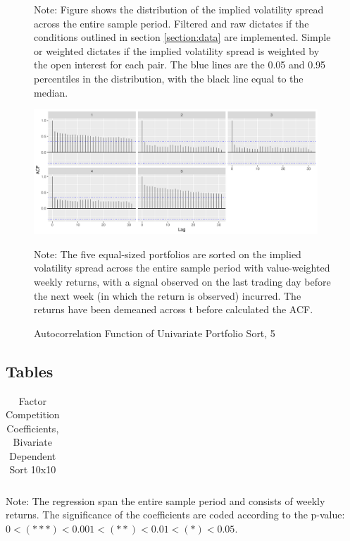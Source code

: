 \begin{figure}
	{\small Note: Figure shows the distribution of the implied volatility spread across the entire sample period. Filtered and raw dictates if the conditions outlined in section \ref{section:data} are implemented. Simple or weighted dictates if the implied volatility spread is weighted by the open interest for each pair. The blue lines are the 0.05 and 0.95 percentiles in the distribution, with the black line equal to the median.}
\end{figure}

\begin{figure}
	\centering
	\caption[ACF of Univariate Portfolio Sort, 5 Implied Vol Spread Level]{Autocorrelation Function of Univariate Portfolio Sort, 5 }
	
	\includegraphics[width=0.95\textwidth]{./Plots/ACF_entireperiod_simple_1.png}
	\label{fig:acf:1}
	
	{\small Note: The five equal-sized portfolios are sorted on the implied volatility spread across the entire sample period with value-weighted weekly returns, with a signal observed on the last trading day before the next week (in which the return is observed) incurred. The returns have been demeaned across t before calculated the ACF.}
	
\end{figure}


\clearpage

\renewcommand\thesubsection{B}
\subsection{Tables}

\begin{table}[ht]
	{\tiny
	\centering
	\caption[Factor Competition, all factors]{Factor Competition Coefficients, Bivariate Dependent Sort 10x10}
	\label{tab:factor_competition_9_ALL}	
	\begin{tabular}{l|lllllllllllllll}
		
	\end{tabular}
	
	
	{\scriptsize \centering Note: The regression span the entire sample period and consists of weekly returns. The significance of  the coefficients are coded according to the p-value: $0 < (\ast\ast\ast) < 0.001 < (\ast\ast) < 0.01 < (\ast) < 0.05$.}}
\end{table}

